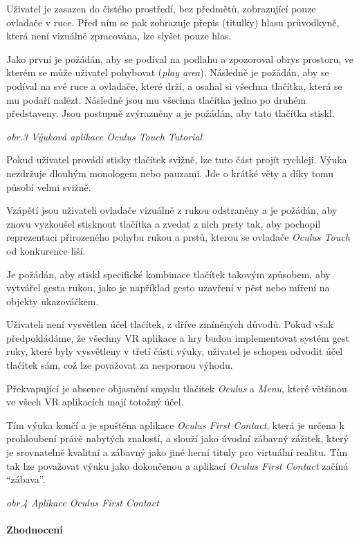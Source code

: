 Uživatel je zasazen do čistého prostředí, bez předmětů, zobrazující
pouze ovladače v ruce. Před ním se pak zobrazuje přepis (titulky) hlasu
průvodkyně, která není vizuálně zpracována, lze slyšet pouze hlas.

Jako první je požádán, aby se podíval na podlahu a zpozoroval obrys
prostoru, ve kterém se může uživatel pohybovat (\emph{play area}).
Následně je požádán, aby se podíval na své ruce a ovladače, které drží,
a osahal si všechna tlačítka, která se mu podaří nalézt. Následně jsou
mu všechna tlačítka jedno po druhém představeny. Jsou postupně
zvýrazněny a je požádán, aby tato tlačítka stiskl.


\emph{obr.3 Výuková aplikace Oculus Touch Tutorial}

Pokud uživatel provádí stisky tlačítek svižně, lze tuto část projít
rychleji. Výuka nezdržuje dlouhým monologem nebo pauzami. Jde o krátké
věty a díky tomu působí velmi svižně.

Vzápětí jsou uživateli ovladače vizuálně z rukou odstraněny a je
požádán, aby znovu vyzkoušel stisknout tlačítka a zvedat z nich prsty
tak, aby pochopil reprezentaci přirozeného pohybu rukou a prstů, kterou
se ovladače \emph{Oculus Touch} od konkurence liší. 

Je požádán, aby
stiskl specifické kombinace tlačítek takovým způsobem, aby vytvářel
gesta rukou, jako je například gesto uzavření v pěst nebo míření na
objekty ukazováčkem.

Uživateli není vysvětlen účel tlačítek, z dříve zmíněných důvodů. Pokud
však předpokládáme, že všechny VR aplikace a hry budou implementovat
systém gest ruky, které byly vysvětleny v třetí části výuky, uživatel je
schopen odvodit účel tlačítek sám, což lze považovat za nespornou
výhodu.

Překvapující je absence objasnění smyslu tlačítek \emph{Oculus} a
\emph{Menu}, které většinou ve všech VR aplikacích mají totožný účel.

Tím výuka končí a je spuštěna aplikace \emph{Oculus First Contact},
která je určena k prohloubení právě nabytých znalostí, a slouží jako
úvodní zábavný zážitek, který je srovnatelně kvalitní a zábavný jako
jiné herní tituly pro virtuální realitu. Tím tak lze považovat výuku
jako dokončenou a aplikací \emph{Oculus First Contact} začíná
``zábava''.


\emph{obr.4 Aplikace Oculus First Contact}

\paragraph{Zhodnocení}\label{zhodnocenuxed-1}

